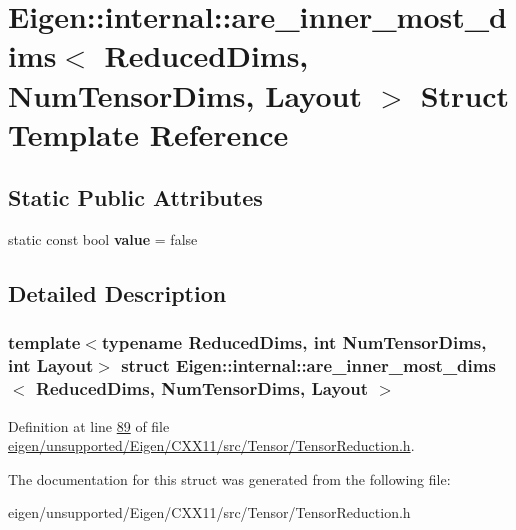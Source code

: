 \hypertarget{struct_eigen_1_1internal_1_1are__inner__most__dims}{}\section{Eigen\+:\+:internal\+:\+:are\+\_\+inner\+\_\+most\+\_\+dims$<$ Reduced\+Dims, Num\+Tensor\+Dims, Layout $>$ Struct Template Reference}
\label{struct_eigen_1_1internal_1_1are__inner__most__dims}
\subsection*{Static Public Attributes}
\begin{DoxyCompactItemize}
\item 
\mbox{\label{struct_eigen_1_1internal_1_1are__inner__most__dims_ad0ac607f4454568bd99a0db7188bb8c4}} 
static const bool {\bfseries value} = false
\end{DoxyCompactItemize}


\subsection{Detailed Description}
\subsubsection*{template$<$typename Reduced\+Dims, int Num\+Tensor\+Dims, int Layout$>$\newline
struct Eigen\+::internal\+::are\+\_\+inner\+\_\+most\+\_\+dims$<$ Reduced\+Dims, Num\+Tensor\+Dims, Layout $>$}



Definition at line \hyperlink{eigen_2unsupported_2_eigen_2_c_x_x11_2src_2_tensor_2_tensor_reduction_8h_source_l00089}{89} of file \hyperlink{eigen_2unsupported_2_eigen_2_c_x_x11_2src_2_tensor_2_tensor_reduction_8h_source}{eigen/unsupported/\+Eigen/\+C\+X\+X11/src/\+Tensor/\+Tensor\+Reduction.\+h}.



The documentation for this struct was generated from the following file\+:\begin{DoxyCompactItemize}
\item 
eigen/unsupported/\+Eigen/\+C\+X\+X11/src/\+Tensor/\+Tensor\+Reduction.\+h\end{DoxyCompactItemize}
